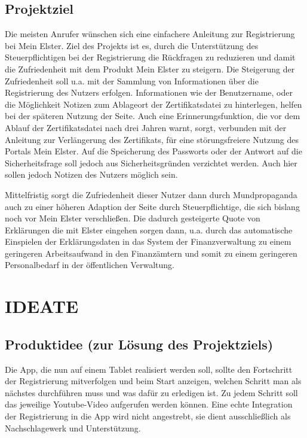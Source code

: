 \subsection{Projektziel}\label{Projektziel}

Die meisten Anrufer wünschen sich eine einfachere Anleitung zur Registrierung bei \grq{}Mein Elster\grq{}. Ziel des Projekts ist es, durch die Unterstützung des Steuerpflichtigen bei der Registrierung die Rückfragen zu reduzieren und damit die Zufriedenheit mit dem Produkt \grq{}Mein Elster\grq{} zu steigern. Die Steigerung der Zufriedenheit soll u.a. mit der Sammlung von Informationen über die Registrierung des Nutzers erfolgen. Informationen wie der Benutzername, oder die Möglichkeit Notizen zum Ablageort der Zertifikatsdatei zu hinterlegen, helfen bei der späteren Nutzung der Seite. Auch eine Erinnerungsfunktion, die vor dem Ablauf der Zertifikatsdatei nach drei Jahren warnt, sorgt, verbunden mit der Anleitung zur Verlängerung des Zertifikats, für eine störungsfreiere Nutzung des Portals \grq{}Mein Elster\grq{}. Auf die Speicherung des Passworts oder der Antwort auf die Sicherheitsfrage soll jedoch aus Sicherheitsgründen verzichtet werden. Auch hier sollen jedoch Notizen des Nutzers möglich sein.

Mittelfristig sorgt die Zufriedenheit dieser Nutzer dann durch Mundpropaganda auch zu einer höheren Adaption der Seite durch Steuerpflichtige, die sich bislang noch vor \grq{}Mein Elster\grq{} verschließen. 
Die dadurch gesteigerte Quote von Erklärungen die mit Elster eingehen sorgen dann, u.a. durch das automatische Einspielen der Erklärungsdaten in das System der Finanzverwaltung zu einem geringeren Arbeitsaufwand in den Finanzämtern und somit zu einem geringeren Personalbedarf in der öffentlichen Verwaltung.



\section{IDEATE}\label{IDEATE}


\subsection{Produktidee (zur Lösung des Projektziels)}\label{Produktidee (zur Lösung des Projektziels) }
Die App, die nun auf einem Tablet realisiert werden soll, sollte den Fortschritt der Registrierung mitverfolgen und beim Start anzeigen, welchen Schritt man als nächstes durchführen muss und was dafür zu erledigen ist. Zu jedem Schritt soll das jeweilige Youtube-Video aufgerufen werden können. Eine echte Integration der Registrierung in die App wird nicht angestrebt, sie dient ausschließlich als Nachschlagewerk und Unterstützung.

